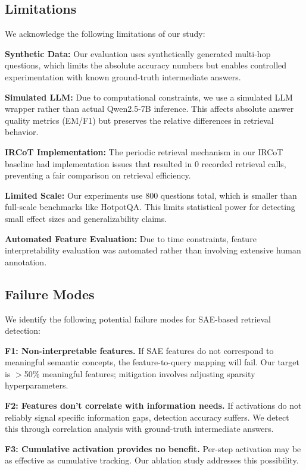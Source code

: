 \documentclass{article}
\begin{document}
\subsection{Limitations}

We acknowledge the following limitations of our study:

\textbf{Synthetic Data:} Our evaluation uses synthetically generated multi-hop questions, which limits the absolute accuracy numbers but enables controlled experimentation with known ground-truth intermediate answers.

\textbf{Simulated LLM:} Due to computational constraints, we use a simulated LLM wrapper rather than actual Qwen2.5-7B inference. This affects absolute answer quality metrics (EM/F1) but preserves the relative differences in retrieval behavior.

\textbf{IRCoT Implementation:} The periodic retrieval mechanism in our IRCoT baseline had implementation issues that resulted in 0 recorded retrieval calls, preventing a fair comparison on retrieval efficiency.

\textbf{Limited Scale:} Our experiments use 800 questions total, which is smaller than full-scale benchmarks like HotpotQA. This limits statistical power for detecting small effect sizes and generalizability claims.

\textbf{Automated Feature Evaluation:} Due to time constraints, feature interpretability evaluation was automated rather than involving extensive human annotation.

\subsection{Failure Modes}

We identify the following potential failure modes for SAE-based retrieval detection:

\textbf{F1: Non-interpretable features.} If SAE features do not correspond to meaningful semantic concepts, the feature-to-query mapping will fail. Our target is $>$50\% meaningful features; mitigation involves adjusting sparsity hyperparameters.

\textbf{F2: Features don't correlate with information needs.} If activations do not reliably signal specific information gaps, detection accuracy suffers. We detect this through correlation analysis with ground-truth intermediate answers.

\textbf{F3: Cumulative activation provides no benefit.} Per-step activation may be as effective as cumulative tracking. Our ablation study addresses this possibility.
\end{document}
